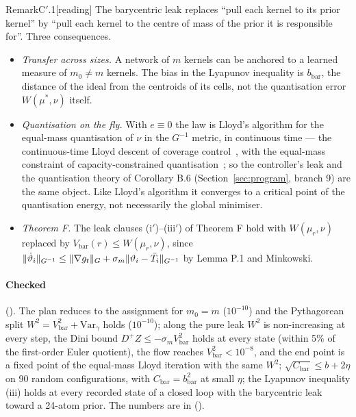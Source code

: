 \begin{rmk}{Remark}{C$'$.1}[reading]
The barycentric leak replaces ``pull each kernel to its prior kernel'' by ``pull each kernel to the centre of mass of
the prior it is responsible for''. Three consequences.
\begin{itemize}
  \item \emph{Transfer across sizes.} A network of $m$ kernels can be anchored to a learned measure of $m_0\ne m$
    kernels. The bias in the Lyapunov inequality is $b_{\mathrm{bar}}$, the distance of the ideal from the centroids
    of its cells, not the quantisation error $W(\mu^*,\nu)$ itself.
  \item \emph{Quantisation on the fly.} With $e\equiv0$ the law is Lloyd's algorithm for the equal-mass quantisation
    of $\nu$ in the $G^{-1}$ metric, in continuous time --- the continuous-time Lloyd descent of coverage
    control~\cite{S18}, with the equal-mass constraint of capacity-constrained quantisation~\cite{S19}; so the
    controller's leak and the quantisation theory of Corollary B.6 (Section~\ref{sec:program}, branch 9) are the same
    object. Like Lloyd's algorithm it converges to a critical point of the quantisation energy, not necessarily the
    global minimiser.
  \item \emph{Theorem F.} The leak clauses (i$'$)--(iii$'$) of Theorem F hold with $W(\mu_r,\nu)$ replaced by
    $V_{\mathrm{bar}}(r) \le W(\mu_r,\nu)$, since
    $\lVert \dot\vartheta_i\rVert_{G^{-1}} \le \lVert \nabla g_t\rVert_G + \sigma_m\lVert \vartheta_i - \bar T_i\rVert_{G^{-1}}$ by
    Lemma P.1 and Minkowski.
\end{itemize}
\end{rmk}

\paragraph{Checked} (). The plan reduces to the assignment for $m_0 = m$
($10^{-10}$) and the Pythagorean split $W^2 = V_{\mathrm{bar}}^2 + \mathrm{Var}_\gamma$ holds ($10^{-10}$); along the
pure leak $W^2$ is non-increasing at every step, the Dini bound $D^+Z \le -\sigma_mV_{\mathrm{bar}}^2$ holds at every
state (within 5\% of the first-order Euler quotient), the flow reaches $V_{\mathrm{bar}}^2 < 10^{-8}$, and the end
point is a fixed point of the equal-mass Lloyd iteration with the same $W^2$; $\sqrt{C_{\mathrm{bar}}} \le b + 2\eta$
on 90 random configurations, with $C_{\mathrm{bar}} = b_{\mathrm{bar}}^2$ at small $\eta$; the Lyapunov inequality
(iii) holds at every recorded state of a closed loop with the barycentric leak toward a 24-atom prior. The numbers are
in  ().

